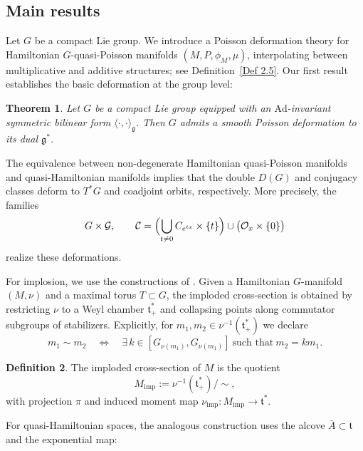 \documentclass[reqno]{amsart}
\theoremstyle{plain}
\newtheorem{Thm}{Theorem}[section]
\theoremstyle{definition}
\newtheorem{Def}[Thm]{Definition}
\newcommand{\G}{\mathcal{G}}
\begin{document}
\subsection{Main results}

Let $G$ be a compact Lie group. We introduce a Poisson deformation theory for Hamiltonian $G$-quasi-Poisson manifolds $(M,P,\phi_M,\mu)$, interpolating between multiplicative and additive structures; see Definition~\ref{Def 2.5}. Our first result establishes the basic deformation at the group level:

\begin{Thm}\label{Thm 1.1}
Let $G$ be a compact Lie group equipped with an $\mathrm{Ad}$-invariant symmetric bilinear form $\langle\cdot,\cdot\rangle_{\mathfrak{g}}$. Then $G$ admits a smooth Poisson deformation to its dual $\mathfrak{g}^*$.
\end{Thm}

The equivalence between non-degenerate Hamiltonian quasi-Poisson manifolds and quasi-Hamiltonian manifolds \cite[Theorem~9.3]{alekseev2002quasi} implies that the double $D(G)$ and conjugacy classes deform to $T^*G$ and coadjoint orbits, respectively. More precisely, the families
\[
G\times \G, \qquad 
\mathcal{C}=\Bigl(\bigcup_{t\neq 0} C_{e^{tx}}\times\{t\}\Bigr)\cup\bigl(\mathcal{O}_x\times\{0\}\bigr)
\]
realize these deformations.

For implosion, we use the constructions of \cite{guillemin2002, hurtubise2006group}. Given a Hamiltonian $G$-manifold $(M,\nu)$ and a maximal torus $T\subset G$, the imploded cross-section is obtained by restricting $\nu$ to a Weyl chamber $\mathfrak{t}_+^*$ and collapsing points along commutator subgroups of stabilizers. Explicitly, for $m_1,m_2\in\nu^{-1}(\mathfrak{t}_+^*)$ we declare
\[
m_1\sim m_2 \quad\Longleftrightarrow\quad 
\exists\,k\in [G_{\nu(m_1)},G_{\nu(m_1)}]\ \text{such that}\ m_2=k m_1.
\]

\begin{Def}\cite[Definition~2.1]{guillemin2002}
The imploded cross-section of $M$ is the quotient
\[
M_{\mathrm{imp}}:=\nu^{-1}(\mathfrak{t}_+^*)/\!\sim,
\]
with projection $\pi$ and induced moment map $\nu_{\mathrm{imp}}:M_{\mathrm{imp}}\to\mathfrak{t}^*$.
\end{Def}

For quasi-Hamiltonian spaces, the analogous construction uses the alcove $\bar{A}\subset\mathfrak{t}$ and the exponential map:
\end{document}
